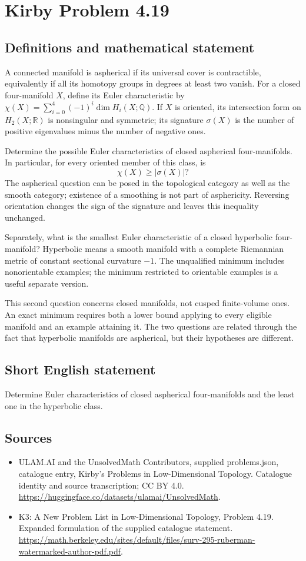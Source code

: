 \documentclass[11pt,a4paper]{article}
\begin{document}
\section*{Kirby Problem 4.19}\label{statement}

\subsection{Definitions and mathematical statement}
A connected manifold is aspherical if its universal cover is contractible, equivalently if all its homotopy groups in degrees at least two vanish. For a closed four-manifold $X$, define its Euler characteristic by $\chi(X)=\sum_{i=0}^4(-1)^i\dim H_i(X;\mathbb Q)$. If $X$ is oriented, its intersection form on $H_2(X;\mathbb R)$ is nonsingular and symmetric; its signature $\sigma(X)$ is the number of positive eigenvalues minus the number of negative ones.

Determine the possible Euler characteristics of closed aspherical four-manifolds. In particular, for every oriented member of this class, is
\[
\chi(X)\ge |\sigma(X)|?
\]
The aspherical question can be posed in the topological category as well as the smooth category; existence of a smoothing is not part of asphericity. Reversing orientation changes the sign of the signature and leaves this inequality unchanged.

Separately, what is the smallest Euler characteristic of a closed hyperbolic four-manifold? Hyperbolic means a smooth manifold with a complete Riemannian metric of constant sectional curvature $-1$. The unqualified minimum includes nonorientable examples; the minimum restricted to orientable examples is a useful separate version.

This second question concerns closed manifolds, not cusped finite-volume ones. An exact minimum requires both a lower bound applying to every eligible manifold and an example attaining it. The two questions are related through the fact that hyperbolic manifolds are aspherical, but their hypotheses are different.
\subsection{Short English statement}
Determine Euler characteristics of closed aspherical four-manifolds and the least one in the hyperbolic class.
\subsection{Sources}
\begin{itemize}
\item[S1] ULAM.AI and the UnsolvedMath Contributors, supplied problems.json, catalogue entry, Kirby's Problems in Low-Dimensional Topology. Catalogue identity and source transcription; CC BY 4.0.
\url{https://huggingface.co/datasets/ulamai/UnsolvedMath}.
\item[S2] K3: A New Problem List in Low-Dimensional Topology, Problem 4.19. Expanded formulation of the supplied catalogue statement.
\url{https://math.berkeley.edu/sites/default/files/surv-295-ruberman-watermarked-author-pdf.pdf}.
\end{itemize}
\end{document}
